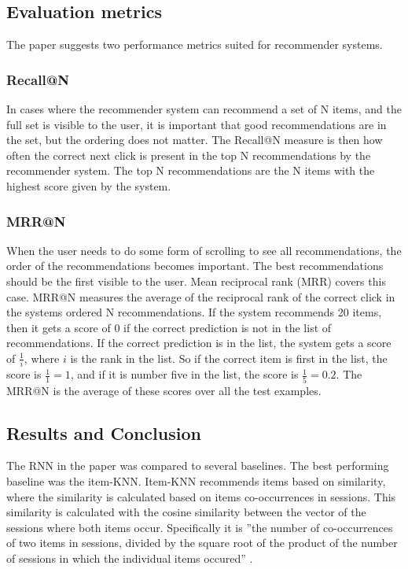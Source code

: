 \subsection{Evaluation metrics}
\label{sec:evaluation-metrics}
The paper suggests two performance metrics suited for recommender systems.

\subsubsection{Recall@N}
In cases where the recommender system can recommend a set of N items, and the full set is visible to the user, it is important that good recommendations are in the set, but the ordering does not matter. The Recall@N measure is then how often the correct next click is present in the top N recommendations by the recommender system. The top N recommendations are the N items with the highest score given by the system.

\subsubsection{MRR@N}
When the user needs to do some form of scrolling to see all recommendations, the order of the recommendations becomes important. The best recommendations should be the first visible to the user. Mean reciprocal rank (MRR) covers this case. MRR@N measures the average of the reciprocal rank of the correct click in the systems ordered N recommendations. If the system recommends 20 items, then it gets a score of 0 if the correct prediction is not in the list of recommendations. If the correct prediction is in the list, the system gets a score of $\frac{1}{i}$, where $i$ is the rank in the list. So if the correct item is first in the list, the score is $\frac{1}{1} = 1$, and if it is number five in the list, the score is $\frac{1}{5} = 0.2$. The MRR@N is the average of these scores over all the test examples.

\subsection{Results and Conclusion}
The RNN in the paper was compared to several baselines. The best performing baseline was the item-KNN. Item-KNN recommends items based on similarity, where the similarity is calculated based on items co-occurrences in sessions. This similarity is calculated with the cosine similarity between the vector of the sessions where both items occur. Specifically it is ''the number of co-occurrences of two items in sessions, divided by the square root of the product of the number of sessions in which the individual items occured'' \cite{DBLP:journals/corr/HidasiKBT15}.

